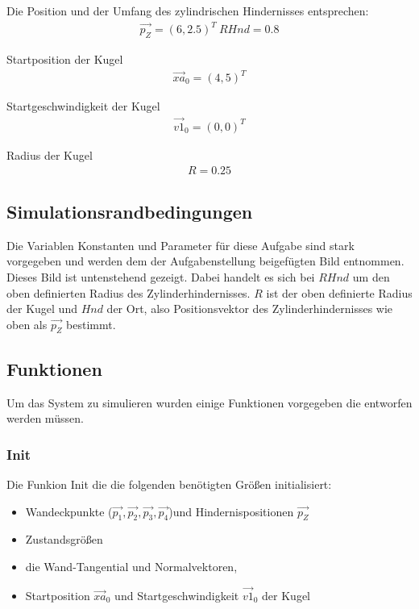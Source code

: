 \documentclass[]{scrartcl}
\begin{document}
Die Position und der Umfang des zylindrischen Hindernisses entsprechen:
\begin{align}
\vec{p_Z} = (6,2.5)^T \ 
RHnd = 0.8
\end{align}

Startposition der Kugel
\begin{align}
\vec{xa}_{0} = (4,5)^T
\end{align}

Startgeschwindigkeit der Kugel
\begin{align}
\vec{v1}_{0} = (0,0)^T
\end{align}

Radius der Kugel
\begin{align}
R = 0.25
\end{align}


\subsection{Simulationsrandbedingungen}
Die Variablen Konstanten und Parameter für diese Aufgabe sind stark vorgegeben und werden dem der Aufgabenstellung beigefügten Bild entnommen. Dieses Bild ist untenstehend gezeigt. Dabei handelt es sich bei $RHnd$ um den oben definierten Radius des Zylinderhindernisses. $R$ ist der oben definierte Radius der Kugel und $Hnd$ der Ort, also Positionsvektor des Zylinderhindernisses wie oben als $\vec{p_Z}$ bestimmt.


\subsection{Funktionen}
Um das System zu simulieren wurden einige Funktionen vorgegeben die entworfen werden müssen. 

\subsubsection{Init}
Die Funkion Init die die folgenden benötigten Größen initialisiert:
\begin{itemize}
\item Wandeckpunkte ($\vec{p_1}, \vec{p_2}, \vec{p_3}, \vec{p_4}$)und Hindernispositionen $\vec{p_Z}$
\item Zustandsgrößen
\item die Wand-Tangential und Normalvektoren,
\item Startposition $\vec{xa}_{0}$ und Startgeschwindigkeit $\vec{v1}_{0}$ der Kugel
\end{itemize}
\end{document}
